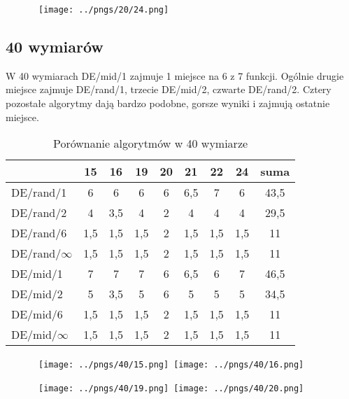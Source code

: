 \begin{figure}[H]
\centering
\mbox{
\texttt{[image: ../pngs/20/24.png]} \quad
}
\end{figure}

\subsection{40 wymiarów}

W 40 wymiarach DE/mid/1 zajmuje 1 miejsce na 6 z 7 funkcji. Ogólnie drugie miejsce zajmuje DE/rand/1,
trzecie DE/mid/2, czwarte DE/rand/2. Cztery pozostałe algorytmy dają bardzo podobne, gorsze
wyniki i zajmują ostatnie miejsce.

\begin{table}[H]
\centering
\begin{tabular}{ l | c | c | c | c | c | c | c | c}
                 & 15  & 16  & 19  & 20  & 21  & 22  & 24  & suma \\ \hline
DE/rand/1        & 6   & 6   & 6   & 6   & 6,5 & 7   & 6   & 43,5 \\ 
DE/rand/2        & 4   & 3,5 & 4   & 2   & 4   & 4   & 4   & 29,5 \\ 
DE/rand/6        & 1,5 & 1,5 & 1,5 & 2   & 1,5 & 1,5 & 1,5 & 11   \\ 
DE/rand/$\infty$ & 1,5 & 1,5 & 1,5 & 2   & 1,5 & 1,5 & 1,5 & 11   \\ 
DE/mid/1         & 7   & 7   & 7   & 6   & 6,5 & 6   & 7   & 46,5 \\
DE/mid/2         & 5   & 3,5 & 5   & 6   & 5   & 5   & 5   & 34,5 \\
DE/mid/6         & 1,5 & 1,5 & 1,5 & 2   & 1,5 & 1,5 & 1,5 & 11   \\ 
DE/mid/$\infty$  & 1,5 & 1,5 & 1,5 & 2   & 1,5 & 1,5 & 1,5 & 11   \\
\end{tabular}
\caption{Porównanie algorytmów w 40 wymiarze}
\label{table:40d}
\end{table}

\begin{figure}[H]
\centering
\mbox{
\texttt{[image: ../pngs/40/15.png]} \quad
\texttt{[image: ../pngs/40/16.png]} 
}
\end{figure}

\begin{figure}[H]
\centering
\mbox{
\texttt{[image: ../pngs/40/19.png]} \quad
\texttt{[image: ../pngs/40/20.png]} 
}
\end{figure}

